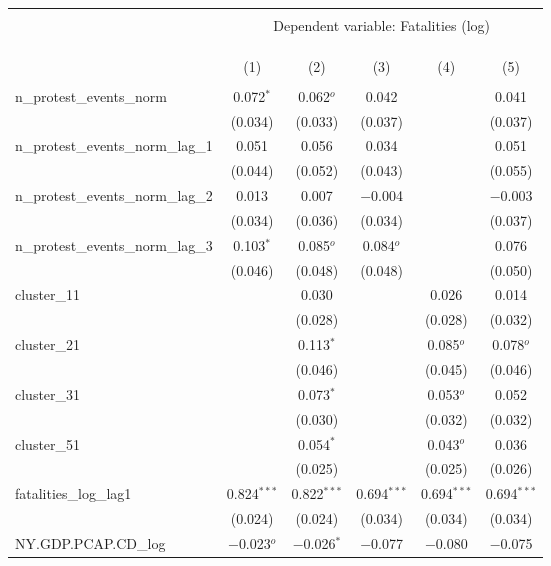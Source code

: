 
\begin{tabular}{@{\extracolsep{5pt}}lccccc} 
\\[-1.8ex]\hline 
\hline \\[-1.8ex] 
 & \multicolumn{5}{c}{Dependent variable: Fatalities (log)} \\ 
\cline{2-6} 
\\[-1.8ex] & \multicolumn{5}{c}{ } \\ 
\\[-1.8ex] & (1) & (2) & (3) & (4) & (5)\\ 
\hline \\[-1.8ex] 
 n\_protest\_events\_norm & 0.072$^{*}$ & 0.062$^{o}$ & 0.042 &  & 0.041 \\ 
  & (0.034) & (0.033) & (0.037) &  & (0.037) \\ 
  n\_protest\_events\_norm\_lag\_1 & 0.051 & 0.056 & 0.034 &  & 0.051 \\ 
  & (0.044) & (0.052) & (0.043) &  & (0.055) \\ 
  n\_protest\_events\_norm\_lag\_2 & 0.013 & 0.007 & $-$0.004 &  & $-$0.003 \\ 
  & (0.034) & (0.036) & (0.034) &  & (0.037) \\ 
  n\_protest\_events\_norm\_lag\_3 & 0.103$^{*}$ & 0.085$^{o}$ & 0.084$^{o}$ &  & 0.076 \\ 
  & (0.046) & (0.048) & (0.048) &  & (0.050) \\ 
  cluster\_11 &  & 0.030 &  & 0.026 & 0.014 \\ 
  &  & (0.028) &  & (0.028) & (0.032) \\ 
  cluster\_21 &  & 0.113$^{*}$ &  & 0.085$^{o}$ & 0.078$^{o}$ \\ 
  &  & (0.046) &  & (0.045) & (0.046) \\ 
  cluster\_31 &  & 0.073$^{*}$ &  & 0.053$^{o}$ & 0.052 \\ 
  &  & (0.030) &  & (0.032) & (0.032) \\ 
  cluster\_51 &  & 0.054$^{*}$ &  & 0.043$^{o}$ & 0.036 \\ 
  &  & (0.025) &  & (0.025) & (0.026) \\ 
  fatalities\_log\_lag1 & 0.824$^{***}$ & 0.822$^{***}$ & 0.694$^{***}$ & 0.694$^{***}$ & 0.694$^{***}$ \\ 
  & (0.024) & (0.024) & (0.034) & (0.034) & (0.034) \\ 
  NY.GDP.PCAP.CD\_log & $-$0.023$^{o}$ & $-$0.026$^{*}$ & $-$0.077 & $-$0.080 & $-$0.075 \\ 

\end{tabular}
